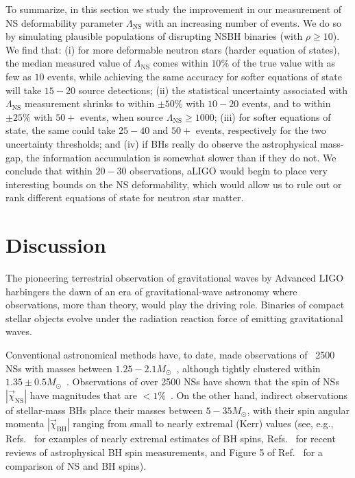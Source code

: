 \documentclass[aps,prd,amsmath,floats,floatfix, twocolumn,
superscriptaddress,nofootinbib,showpacs]{revtex4-1}
\newcommand{\lambdans}{\Lambda_\mathrm{NS}}
\begin{document}
To summarize, in this section we study the improvement in our measurement of 
NS deformability parameter $\lambdans$ with an increasing number of events. We
do so by simulating plausible populations of disrupting NSBH binaries (with
$\rho\geq 10$). We find that:
(i) for more deformable neutron stars (harder equation of states), the median
measured value of $\lambdans$ comes within $10\%$ of the true value with as 
few as $10$ events, while achieving the same accuracy for softer equations of 
state will take $15-20$ source detections; (ii) the statistical uncertainty
associated with $\lambdans$ measurement shrinks to within $\pm50\%$ with
$10-20$ events, and to within $\pm 25\%$ with $50+$ events, when source 
$\lambdans\geq 1000$; (iii) for softer equations of state, the same could take
$25-40$ and $50+$ events, respectively for the two uncertainty thresholds;
and (iv) if BHs really do observe the astrophysical mass-gap, the information
accumulation is somewhat slower than if they do not. We conclude that within
$20-30$ observations, aLIGO would begin to place very interesting bounds on 
the NS deformability, which would allow us to rule out or rank different
equations of state for neutron star matter.




\section{Discussion}\label{s1:discussion}


The pioneering terrestrial observation of gravitational waves by Advanced LIGO
harbingers the dawn of an era of gravitational-wave astronomy where 
observations, more than theory, would play the driving role. Binaries of 
compact stellar objects evolve under the radiation reaction force of emitting
gravitational waves.


Conventional astronomical methods have, to date, made observations of ~2500
NSs with masses between $1.25-2.1 M_\odot$~\cite{Lyne:2004cj,
Demorest:2010bx,2013Sci...340..448A,atnfcatalog,mcgillmagnetarcatalog,
stellarcollapsemass}, although
tightly clustered within $1.35\pm0.5M_\odot$~\cite{stellarcollapsemass}.
%
Observations of over 2500 NSs have shown that the spin of NSs
$|\vec{\chi}_\mathrm{NS}|$ have magnitudes that are $<1\%$~\cite{Miller:2014aaa}.
%
On the other hand, indirect observations of stellar-mass BHs place their
masses between $5-35M_\odot$, with their spin angular momenta 
$|\vec{\chi}_\mathrm{BH}|$ ranging from small to nearly extremal (Kerr) values
(see, e.g., Refs.~\cite{McClintockEtAl:2006,Miller:2009cw,Gou:2014una} for 
examples of nearly extremal estimates of BH spins, Refs.~\cite{McClintock:2013vwa,
Reynolds:2013qqa} for recent reviews of astrophysical BH spin measurements,
and Figure 5 of Ref.~\cite{Miller:2014aaa} for a comparison of NS and BH spins).
\end{document}
